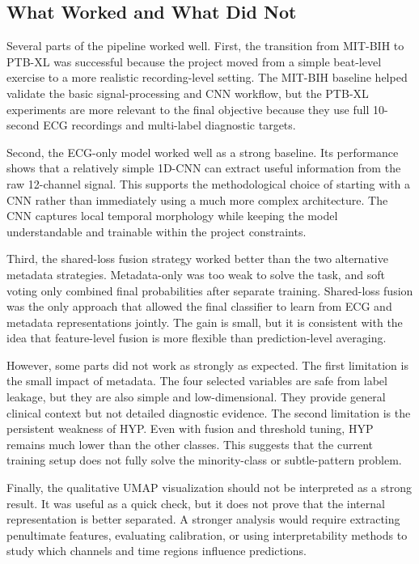 \documentclass[11pt,a4paper]{article}
\begin{document}
\subsection{What Worked and What Did Not}

Several parts of the pipeline worked well. First, the transition from MIT-BIH to PTB-XL was successful because the project moved from a simple beat-level exercise to a more realistic recording-level setting. The MIT-BIH baseline helped validate the basic signal-processing and CNN workflow, but the PTB-XL experiments are more relevant to the final objective because they use full 10-second ECG recordings and multi-label diagnostic targets.

Second, the ECG-only model worked well as a strong baseline. Its performance shows that a relatively simple 1D-CNN can extract useful information from the raw 12-channel signal. This supports the methodological choice of starting with a CNN rather than immediately using a much more complex architecture. The CNN captures local temporal morphology while keeping the model understandable and trainable within the project constraints.

Third, the shared-loss fusion strategy worked better than the two alternative metadata strategies. Metadata-only was too weak to solve the task, and soft voting only combined final probabilities after separate training. Shared-loss fusion was the only approach that allowed the final classifier to learn from ECG and metadata representations jointly. The gain is small, but it is consistent with the idea that feature-level fusion is more flexible than prediction-level averaging.

However, some parts did not work as strongly as expected. The first limitation is the small impact of metadata. The four selected variables are safe from label leakage, but they are also simple and low-dimensional. They provide general clinical context but not detailed diagnostic evidence. The second limitation is the persistent weakness of HYP. Even with fusion and threshold tuning, HYP remains much lower than the other classes. This suggests that the current training setup does not fully solve the minority-class or subtle-pattern problem.

Finally, the qualitative UMAP visualization should not be interpreted as a strong result. It was useful as a quick check, but it does not prove that the internal representation is better separated. A stronger analysis would require extracting penultimate features, evaluating calibration, or using interpretability methods to study which channels and time regions influence predictions.
\end{document}
